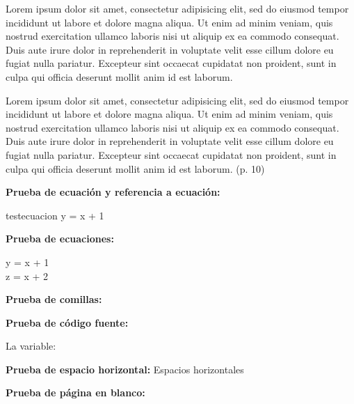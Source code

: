 \documentclass{uclamsc}
\begin{document}
\begin{contenido}
Lorem ipsum dolor sit amet, consectetur adipisicing elit, sed do eiusmod tempor incididunt ut labore et dolore magna aliqua. Ut enim ad minim veniam, quis nostrud exercitation ullamco laboris nisi ut aliquip ex ea commodo consequat. Duis aute irure dolor in reprehenderit in voluptate velit esse cillum dolore eu fugiat nulla pariatur. Excepteur sint occaecat cupidatat non proident, sunt in culpa qui officia deserunt mollit anim id est laborum.

\begin{citatextual}
Lorem ipsum dolor sit amet, consectetur adipisicing elit, sed do eiusmod tempor incididunt ut labore et dolore magna aliqua. Ut enim ad minim veniam, quis nostrud exercitation ullamco laboris nisi ut aliquip ex ea commodo consequat. Duis aute irure dolor in reprehenderit in voluptate velit esse cillum dolore eu fugiat nulla pariatur. Excepteur sint occaecat cupidatat non proident, sunt in culpa qui officia deserunt mollit anim id est laborum.
(p. 10)
\end{citatextual}

\espaciodoble\textbf{Prueba de ecuación y referencia a ecuación:}


\begin{ecuacion}{testecuacion}
	y = x + 1
\end{ecuacion}

\espaciodoble\textbf{Prueba de ecuaciones:}

\begin{ecuaciones}
	y = x + 1 \\
	z = x + 2
\end{ecuaciones}

\espaciodoble\textbf{Prueba de comillas:}


\espaciodoble\textbf{Prueba de código fuente:}

La variable: 

\espaciodoble\textbf{Prueba de espacio horizontal:}
Espacios  horizontales

\espaciodoble\textbf{Prueba de página en blanco:}
\pagenblanco

\end{contenido}

\hacerbibliografia
\end{document}
